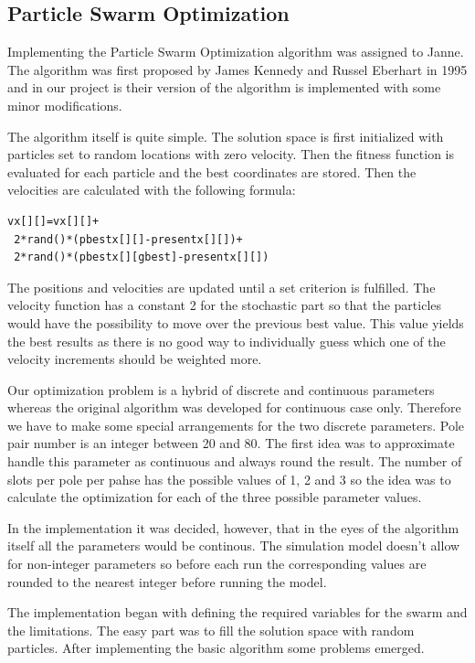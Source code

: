\documentclass[twoside]{article}
\begin{document}
\begin{multicols}{2}
\section{Particle Swarm Optimization}

Implementing the Particle Swarm Optimization algorithm was assigned to Janne. The algorithm was first proposed by James Kennedy and Russel Eberhart in 1995 and in our project is their version of the algorithm is implemented with some minor modifications.

The algorithm itself is quite simple. The solution space is first initialized with particles set to random locations with zero velocity. Then the fitness function is evaluated for each particle and the best coordinates are stored. Then the velocities are calculated with the following formula: \cite{pso}
\begin{verbatim}
vx[][]=vx[][]+
 2*rand()*(pbestx[][]-presentx[][])+
 2*rand()*(pbestx[][gbest]-presentx[][])
\end{verbatim}
	
The positions and velocities are updated until a set criterion is fulfilled. The velocity function has a constant 2 for the stochastic part so that the particles would have the possibility to move over the previous best value. This value yields the best results as there is no good way to individually guess which one of the velocity increments should be weighted more. \cite{pso} 
	
	Our optimization problem is a hybrid of discrete and continuous parameters whereas the original algorithm was developed for continuous case only. Therefore we have to make some special arrangements for the two discrete parameters. Pole pair number is an integer between 20 and 80. The first idea was to approximate handle this parameter as continuous and always round the result. The number of slots per pole per pahse has the possible values of 1, 2 and 3 so the idea was to calculate the optimization for each of the three possible parameter values.
	
	In the implementation it was decided, however, that in the eyes of the algorithm itself all the parameters would be continous. The simulation model doesn't allow for non-integer parameters so before each run the corresponding values are rounded to the nearest integer before running the model.
	
	The implementation began with defining the required variables for the swarm and the limitations. The easy part was to fill the solution space with random particles. After implementing the basic algorithm some problems emerged.
	

\end{multicols}
\end{document}
